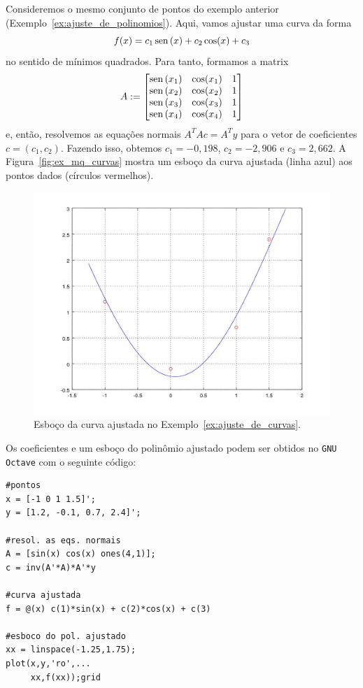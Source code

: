 \begin{ex}\label{ex:ajuste_de_curvas}
  Consideremos o mesmo conjunto de pontos do exemplo anterior (Exemplo~\ref{ex:ajuste_de_polinomios}). Aqui, vamos ajustar uma curva da forma
  \begin{equation}
    f(x) = c_1\operatorname{sen}\,(x) + c_2\cos(x) + c_3
  \end{equation}
no sentido de mínimos quadrados. Para tanto, formamos a matrix
\begin{equation}
  A :=
  \begin{bmatrix}
    \operatorname{sen}\,(x_1) & \cos(x_1) & 1 \\
    \operatorname{sen}\,(x_2) & \cos(x_2) & 1 \\
    \operatorname{sen}\,(x_3) & \cos(x_3) & 1 \\
    \operatorname{sen}\,(x_4) & \cos(x_4) & 1 \\
  \end{bmatrix}
\end{equation}
  e, então, resolvemos as equações normais $A^TAc = A^Ty$ para o vetor de coeficientes $c=(c_1, c_2)$. Fazendo isso, obtemos $c_1=-0,198$, $c_2=-2,906$ e $c_3=2,662$. A Figura~\ref{fig:ex_mq_curvas} mostra um esboço da curva ajustada (linha azul) aos pontos dados (círculos vermelhos).

  \begin{figure}[h]
    \centering
    \includegraphics[width=\textwidth]{cap_ajuste/figs/ex_mq_curvas/ex_mq_curvas}
    \caption{Esboço da curva ajustada no Exemplo~\ref{ex:ajuste_de_curvas}.}
    \label{fig:ex_mq_poli}
  \end{figure}

\ifisoctave
Os coeficientes e um esboço do polinômio ajustado podem ser obtidos no \verb+GNU Octave+ com o seguinte código:
\begin{verbatim}
#pontos
x = [-1 0 1 1.5]';
y = [1.2, -0.1, 0.7, 2.4]';

#resol. as eqs. normais
A = [sin(x) cos(x) ones(4,1)];
c = inv(A'*A)*A'*y

#curva ajustada
f = @(x) c(1)*sin(x) + c(2)*cos(x) + c(3)

#esboco do pol. ajustado
xx = linspace(-1.25,1.75);
plot(x,y,'ro',...
     xx,f(xx));grid
\end{verbatim}
\fi

\end{ex}

